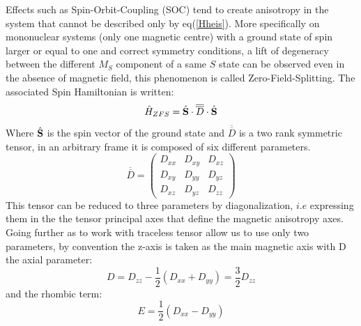 \documentclass[10pt]{report}
\numberwithin{equation}{section}
\begin{document}
\par Effects such as Spin-Orbit-Coupling (SOC) tend to create anisotropy in the system that cannot be described only by eq(\ref{Hheis}). 
More specifically on mononuclear systems (only one magnetic centre) with a ground state of spin larger or equal to one and correct symmetry conditions, a lift of degeneracy between the different $M_S$ component of a same $S$ state can be observed even in the absence of magnetic field, this phenomenon is called Zero-Field-Splitting.
The associated Spin Hamiltonian is written:
\begin{equation}\label{SDS}
    \hat{H}_{ZFS}=\hat{\vb S} \cdot \overline{\overline{D}} \cdot \hat{\vb S}
\end{equation}
Where $\hat{\vb S}$ is the spin vector of the ground state and $\overline{\overline{D}}$ is a two rank symmetric tensor, in an arbitrary frame it is composed of six different parameters.
\begin{equation}
    \overline{\overline{D}}=\begin{pmatrix}
        D_{xx} & D_{xy} & D_{xz}\\
        D_{xy} & D_{yy} & D_{yz}\\
        D_{xz} & D_{yz} & D_{zz}
    \end{pmatrix}
\end{equation}
This tensor can be reduced to three parameters by diagonalization, $\textit{i.e}$ expressing them in the the tensor principal axes that define the magnetic anisotropy axes.
Going further as to work with traceless tensor allow us to use only two parameters, by convention the z-axis is taken as the main magnetic axis with D the axial parameter:
\begin{equation}\label{ParametreD}
    D=D_{zz}-\frac{1}{2}(D_{xx}+D_{yy})=\frac{3}{2}D_{zz}
\end{equation}
and the rhombic term:
\begin{equation}\label{ParametreE}
    E=\frac{1}{2}(D_{xx}-D_{yy})
\end{equation}
\end{document}
